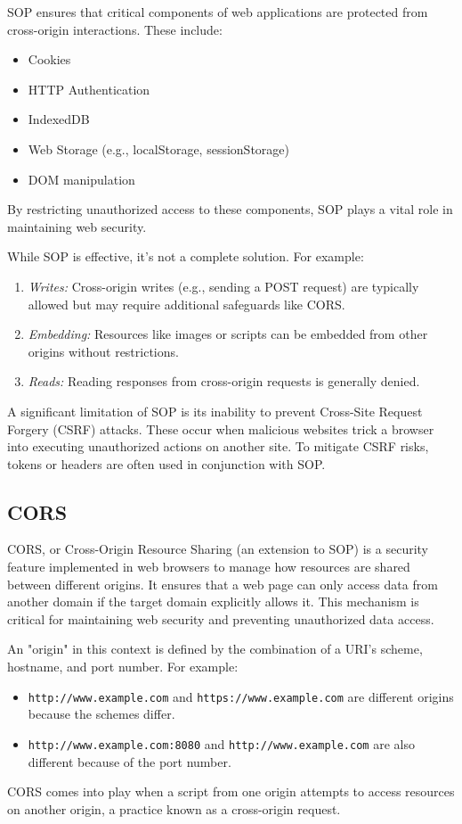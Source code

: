 SOP ensures that critical components of web applications are protected from cross-origin interactions. These include:
\begin{itemize}
    \item Cookies
    \item HTTP Authentication
    \item IndexedDB
    \item Web Storage (e.g., localStorage, sessionStorage)
    \item DOM manipulation
\end{itemize}
By restricting unauthorized access to these components, SOP plays a vital role in maintaining web security.

While SOP is effective, it’s not a complete solution. For example:
\begin{enumerate}
    \item \textit{Writes:} Cross-origin writes (e.g., sending a POST request) are typically allowed but may require additional safeguards like CORS.
    \item \textit{Embedding:} Resources like images or scripts can be embedded from other origins without restrictions.
    \item \textit{Reads:} Reading responses from cross-origin requests is generally denied.
\end{enumerate}
A significant limitation of SOP is its inability to prevent Cross-Site Request Forgery (CSRF) attacks. These occur when malicious websites trick a browser into executing unauthorized actions on another site. To mitigate CSRF risks, tokens or headers are often used in conjunction with SOP.

\subsection*{CORS}
CORS, or Cross-Origin Resource Sharing (an extension to SOP) is a security feature implemented in web browsers to manage how resources are shared between different origins. It ensures that a web page can only access data from another domain if the target domain explicitly allows it. This mechanism is critical for maintaining web security and preventing unauthorized data access.

An "origin" in this context is defined by the combination of a URI's scheme, hostname, and port number. For example:
\begin{itemize}
    \item \texttt{http://www.example.com} and \texttt{https://www.example.com} are different origins because the schemes differ.
    \item \texttt{http://www.example.com:8080} and \texttt{http://www.example.com} are also different because of the port number.
\end{itemize}
CORS comes into play when a script from one origin attempts to access resources on another origin, a practice known as a cross-origin request.

